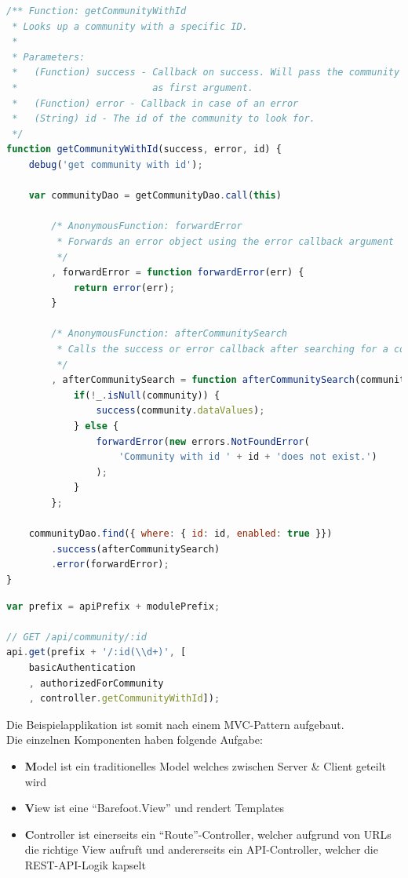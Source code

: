 \begin{lstlisting}[language=JavaScript, caption=API-Controller Beispiel \cite{roomiesCommunityApiExample}, label=lst:roomiesControllerExample, firstnumber=294]
/** Function: getCommunityWithId
 * Looks up a community with a specific ID.
 *
 * Parameters:
 *   (Function) success - Callback on success. Will pass the community data
 *                        as first argument.
 *   (Function) error - Callback in case of an error
 *   (String) id - The id of the community to look for.
 */
function getCommunityWithId(success, error, id) {
	debug('get community with id');

	var communityDao = getCommunityDao.call(this)

		/* AnonymousFunction: forwardError
		 * Forwards an error object using the error callback argument
		 */
		, forwardError = function forwardError(err) {
			return error(err);
		}

		/* AnonymousFunction: afterCommunitySearch
		 * Calls the success or error callback after searching for a community.
		 */
		, afterCommunitySearch = function afterCommunitySearch(community) {
			if(!_.isNull(community)) {
				success(community.dataValues);
			} else {
				forwardError(new errors.NotFoundError(
					'Community with id ' + id + 'does not exist.')
				);
			}
		};

	communityDao.find({ where: { id: id, enabled: true }})
		.success(afterCommunitySearch)
		.error(forwardError);
}
\end{lstlisting}

\begin{lstlisting}[language=JavaScript, caption=API-Route Beispiel \cite{communityApiDefinition}, label=lst:roomiesComponentExample, firstnumber=31]
var prefix = apiPrefix + modulePrefix;

// GET /api/community/:id
api.get(prefix + '/:id(\\d+)', [
	basicAuthentication
	, authorizedForCommunity
	, controller.getCommunityWithId]);
\end{lstlisting}

Die Beispielapplikation ist somit nach einem MVC-Pattern aufgebaut. \\
Die einzelnen Komponenten haben folgende Aufgabe:
\begin{itemize}
	\item{\textbf{M}odel ist ein traditionelles Model welches zwischen Server \& Client geteilt wird}
	\item{\textbf{V}iew ist eine ``Barefoot.View'' \cite{BarefootView} und rendert Templates}
	\item{\textbf{C}ontroller ist einerseits ein ``Route''-Controller, welcher aufgrund von URLs die richtige View aufruft und andererseits ein API-Controller, welcher die REST-API-Logik kapselt}
\end{itemize}

